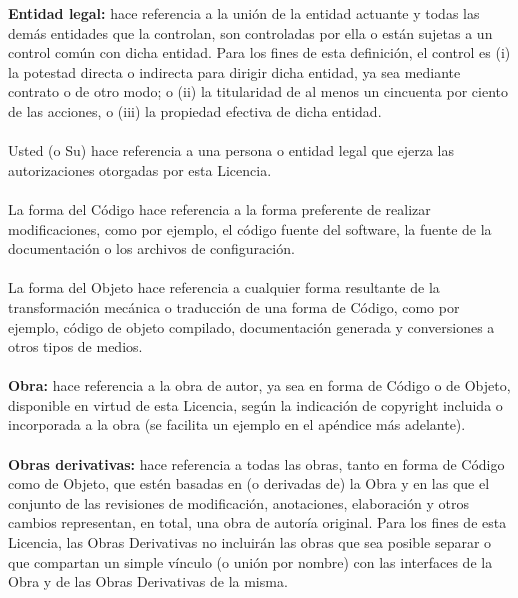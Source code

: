 \textbf{Entidad legal:} hace referencia a la unión de la entidad actuante y todas las demás entidades que la controlan, son controladas por ella o están sujetas a un control común con dicha entidad. Para los fines de esta definición, el control es (i) la potestad directa o indirecta para dirigir dicha entidad, ya sea mediante contrato o de otro modo; o (ii) la titularidad de al menos un cincuenta por ciento  de las acciones, o (iii) la propiedad efectiva de dicha entidad.\\\\
 
Usted (o Su) hace referencia a una persona o entidad legal que ejerza las autorizaciones otorgadas por esta Licencia.\\\\

La forma del Código hace referencia a la forma preferente de realizar modificaciones, como por ejemplo, el código fuente del software, la fuente de la documentación o los archivos de configuración.\\\\

La forma del Objeto hace referencia a cualquier forma resultante de la transformación mecánica o traducción de una forma de Código, como por ejemplo, código de objeto compilado, documentación generada y conversiones a otros tipos de medios.\\\\

\textbf{Obra:} hace referencia a la obra de autor, ya sea en forma de Código o de Objeto, disponible en virtud de esta Licencia, según la indicación de copyright incluida o incorporada a la obra (se facilita un ejemplo en el apéndice más adelante).\\\\

\textbf{Obras derivativas:} hace referencia a todas las obras, tanto en forma de Código como de Objeto, que estén basadas en (o derivadas de) la Obra y en las que el conjunto de las revisiones de modificación, anotaciones, elaboración y otros cambios representan, en total, una obra de autoría original. Para los fines de esta Licencia, las Obras Derivativas no incluirán las obras que sea posible separar o que compartan un simple vínculo (o unión por nombre) con las interfaces de la Obra y de las Obras Derivativas de la misma.\\\\


